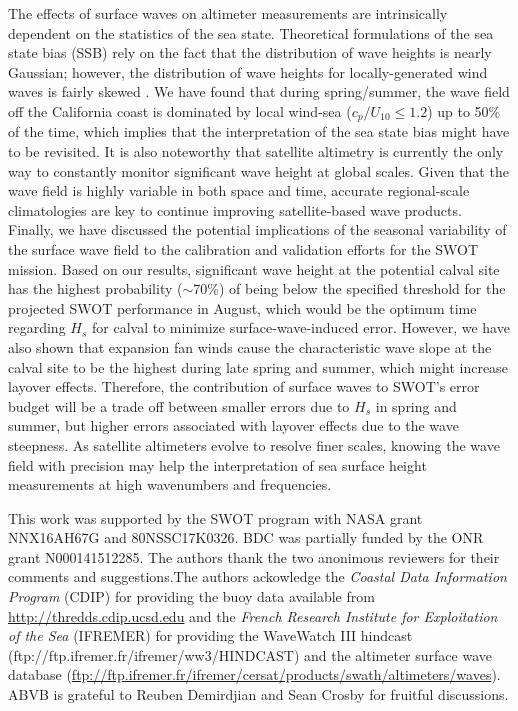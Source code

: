 The effects of surface waves on altimeter measurements are intrinsically dependent on the statistics of the sea state. Theoretical formulations of the sea state bias (SSB) rely on the fact that the distribution of wave heights is nearly Gaussian; however, the distribution of wave heights for locally-generated wind waves is fairly skewed \citep[e.g.]{fu1991effect,glazman1990effects}. We have found that during spring/summer, the wave field off the California coast is dominated by local wind-sea ($c_p/U_{10} \leq 1.2$) up to 50\% of the time, which implies that the interpretation of the sea state bias might have to be revisited. It is also noteworthy that satellite altimetry is currently the only way to constantly monitor significant wave height at global scales. Given that the wave field is highly variable in both space and time, accurate regional-scale climatologies are key to continue improving satellite-based wave products.
Finally, we have discussed the potential implications of the seasonal variability of the surface wave field to the calibration and validation efforts for the SWOT mission. Based on our results, significant wave height at the potential calval site has the highest probability ($\sim$70\%) of being below the specified threshold for the projected SWOT performance in August, which would be the optimum time regarding $H_s$ for calval to minimize surface-wave-induced error. However, we have also shown that expansion fan winds cause the characteristic wave slope at the calval site to be the highest during late spring and summer, which might increase layover effects. Therefore, the contribution of surface waves to SWOT's error budget will be a trade off between smaller errors due to $H_s$ in spring and summer, but higher errors associated with layover effects due to the wave steepness. As satellite altimeters evolve to resolve finer scales, knowing the wave field with precision may help the interpretation of sea surface height measurements at high wavenumbers and frequencies. 

%

\acknowledgments
This work was supported by the SWOT program with NASA grant 
NNX16AH67G and 80NSSC17K0326. BDC was partially funded by the ONR grant  N000141512285.
The authors thank the two anonimous reviewers for their comments and
suggestions.The authors ackowledge the \textit{Coastal Data Information Program} (CDIP)
for providing the buoy data available from \url{http://thredds.cdip.ucsd.edu} 
and the \textit{French Research Institute for Exploitation of the Sea}
(IFREMER) for providing the WaveWatch III hindcast (ftp://ftp.ifremer.fr/ifremer/ww3/HINDCAST) 
and the altimeter surface wave database
(\url{ftp://ftp.ifremer.fr/ifremer/cersat/products/swath/altimeters/waves}).  
ABVB is grateful to Reuben Demirdjian and Sean Crosby for fruitful 
discussions. 

